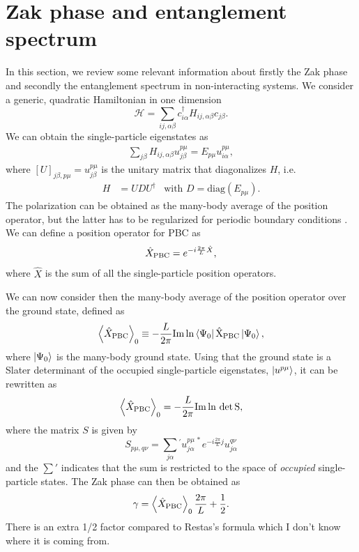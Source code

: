 \documentclass[twocolumn,amsmath,longbibliography,amssymb,superscriptaddress]{revtex4-1}
\newcommand{\carlos}[1]{{\color{red} #1}}
\begin{document}
\section{Zak phase and entanglement spectrum}
In this section, we review some relevant information about firstly the Zak phase and secondly the entanglement spectrum in non-interacting systems. 
We consider a generic, quadratic Hamiltonian in one dimension
\begin{equation}
\mathcal{H} = \sum_{ij,\alpha\beta} c_{i\alpha}^\dagger H_{ij,\alpha \beta}c_{j\beta}.
\end{equation}
We can obtain the single-particle eigenstates as
\begin{align}
\sum_{j\beta}H_{ij,\alpha\beta} u^{p\mu}_{j\beta} = E_{p\mu} u_{i\alpha}^{p\mu},
\end{align}
where $[U]_{j\beta,p\mu} = u^{p\mu}_{j\beta}$ is the unitary matrix that diagonalizes $H$, i.e. 
\begin{align}\label{eq:D}
H&=UDU^\dagger& \mbox{with } D=\mbox{diag}(E_{p\mu}).
\end{align} 
The polarization can be obtained as the many-body average of the position operator, but the latter has to be regularized for periodic boundary conditions \cite{Resta1997}. 
We can define a position operator for PBC as
\begin{equation}
\hat{X}_{\rm PBC} = e^{-i\frac{2\pi}{L}\hat{X}},
\end{equation}
where $\hat{X}$ is the sum of all the single-particle position operators. 


We can now consider then the many-body average of the position operator over the ground state, defined as
\begin{align}
\expval{\hat{X}_{\rm PBC}}_0 \equiv -\frac{L}{2\pi} \rm{ Im }\ln\bra{\Psi_0}\hat{X}_{\rm PBC}\ket{\Psi_0},
\end{align}
where $\ket{\Psi_0}$ is the many-body ground state. 
Using that the ground state is a Slater determinant of the occupied single-particle eigenstates, $\ket{u^{p\mu}}$, it can be rewritten as
\begin{align}
\expval{\hat{X}_{\rm PBC}}_0 = -\frac{L}{2\pi} \rm{Im }\ln \, {\rm det} \, S,
\end{align}
where the matrix $S$ is given by
\begin{equation}
S_{p\mu,q\nu} = \sum_{j\alpha}\!^{'} u^{p\mu\, \ast}_{j \alpha} e^{-i\frac{2\pi}{L}j}u^{q\nu}_{j \alpha}
\end{equation}
and the $\sum\!{'}$ indicates that the sum is restricted to the space of \emph{occupied} single-particle states. 
The Zak phase can then be obtained as
\begin{equation}
\gamma = \expval{\hat{X}_{\rm PBC}}_0\frac{2\pi}{L} + \frac{1}{2}.
\end{equation}
\carlos{There is an extra 1/2 factor compared to Restas's formula which I don't know where it is coming from.}
\end{document}
